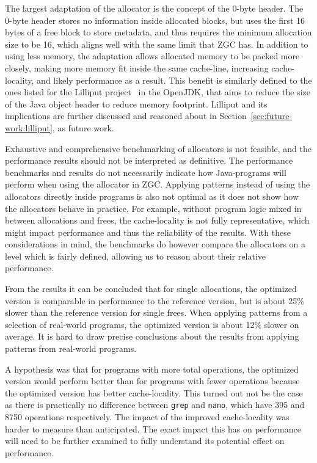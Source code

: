 
The largest adaptation of the allocator is the concept of the 0-byte header. The 0-byte header stores no information inside allocated blocks, but uses the first 16 bytes of a free block to store metadata, and thus requires the minimum allocation size to be 16, which aligns well with the same limit that ZGC has. In addition to using less memory, the adaptation allows allocated memory to be packed more closely, making more memory fit inside the same cache-line, increasing cache-locality, and likely performance as a result. This benefit is similarly defined to the ones listed for the Lilliput project~\cite{lilliput} in the OpenJDK, that aims to reduce the size of the Java object header to reduce memory footprint. Lilliput and its implications are further discussed and reasoned about in Section~\ref{sec:future-work:lilliput}, as future work.

Exhaustive and comprehensive benchmarking of allocators is not feasible, and the performance results should not be interpreted as definitive. The performance benchmarks and results do not necessarily indicate how Java-programs will perform when using the allocator in ZGC. Applying patterns instead of using the allocators directly inside programs is also not optimal as it does not show how the allocators behave in practice. For example, without program logic mixed in between allocations and frees, the cache-locality is not fully representative, which might impact performance and thus the reliability of the results. With these considerations in mind, the benchmarks do however compare the allocators on a level which is fairly defined, allowing us to reason about their relative performance. 

From the results it can be concluded that for single allocations, the optimized version is comparable in performance to the reference version, but is about 25\% slower than the reference version for single frees. When applying patterns from a selection of real-world programs, the optimized version is about 12\% slower on average. It is hard to draw precise conclusions about the results from applying patterns from real-world programs. 

A hypothesis was that for programs with more total operations, the optimized version would perform better than for programs with fewer operations because the optimized version has better cache-locality. This turned out not be the case as there is practically no difference between \texttt{grep} and \texttt{nano}, which have 395 and 8750 operations respectively. The impact of the improved cache-locality was harder to measure than anticipated. The exact impact this has on performance will need to be further examined to fully understand its potential effect on performance.

